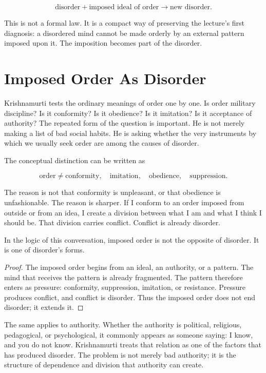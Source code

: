 \begin{equation}
\text{disorder} + \text{imposed ideal of order}
\longrightarrow
\text{new disorder}.
\end{equation}

This is not a formal law. It is a compact way of preserving the lecture's first diagnosis: a disordered mind cannot be made orderly by an external pattern imposed upon it. The imposition becomes part of the disorder.

\section{Imposed Order As Disorder}

Krishnamurti tests the ordinary meanings of order one by one. Is order military discipline? Is it conformity? Is it obedience? Is it imitation? Is it acceptance of authority? The repeated form of the question is important. He is not merely making a list of bad social habits. He is asking whether the very instruments by which we usually seek order are among the causes of disorder.

The conceptual distinction can be written as

\begin{equation}
\text{order} \neq
\text{conformity},\quad
\text{imitation},\quad
\text{obedience},\quad
\text{suppression}.
\end{equation}

The reason is not that conformity is unpleasant, or that obedience is unfashionable. The reason is sharper. If I conform to an order imposed from outside or from an idea, I create a division between what I am and what I think I should be. That division carries conflict. Conflict is already disorder.

\begin{proposition}
In the logic of this conversation, imposed order is not the opposite of disorder. It is one of disorder's forms.
\end{proposition}

\begin{proof}
The imposed order begins from an ideal, an authority, or a pattern. The mind that receives the pattern is already fragmented. The pattern therefore enters as pressure: conformity, suppression, imitation, or resistance. Pressure produces conflict, and conflict is disorder. Thus the imposed order does not end disorder; it extends it.
\end{proof}

The same applies to authority. Whether the authority is political, religious, pedagogical, or psychological, it commonly appears as someone saying: I know, and you do not know. Krishnamurti treats that relation as one of the factors that has produced disorder. The problem is not merely bad authority; it is the structure of dependence and division that authority can create.

